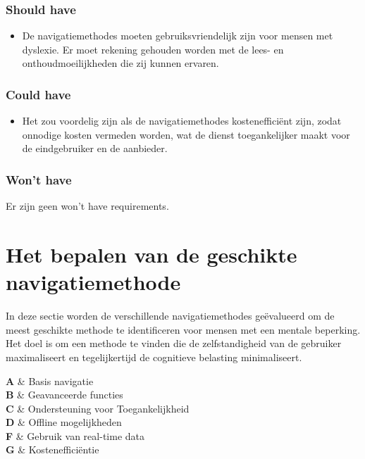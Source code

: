 \subsubsection{Should have}
\begin{itemize}
    \item De navigatiemethodes moeten gebruiksvriendelijk zijn voor mensen met dyslexie. Er moet rekening gehouden worden met de lees- en onthoudmoeilijkheden die zij kunnen ervaren.
\end{itemize}

\subsubsection{Could have}
\begin{itemize}
    \item Het zou voordelig zijn als de navigatiemethodes kostenefficiënt zijn, zodat onnodige kosten vermeden worden, wat de dienst toegankelijker maakt voor de eindgebruiker en de aanbieder.
\end{itemize}

\subsubsection{Won't have}

Er zijn geen won't have requirements.

\section{Het bepalen van de geschikte navigatiemethode}
\label{sec:bepalen geschikte navigatiemethode}


In deze sectie worden de verschillende navigatiemethodes geëvalueerd om de meest geschikte methode te identificeren voor mensen met een mentale beperking. Het doel is om een methode te vinden die de zelfstandigheid van de gebruiker maximaliseert en tegelijkertijd de cognitieve belasting minimaliseert.


\textbf{A} \& Basis navigatie \\
\textbf{B} \& Geavanceerde functies \\
\textbf{C} \& Ondersteuning voor Toegankelijkheid \\
\textbf{D} \& Offline mogelijkheden \\
\textbf{F} \& Gebruik van real-time data \\
\textbf{G} \& Kostenefficiëntie \\

